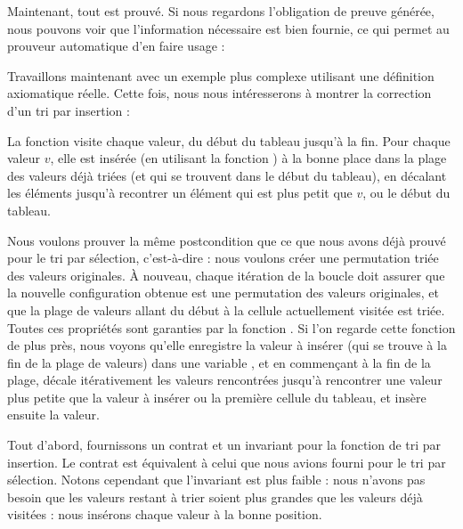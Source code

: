 


Maintenant, tout est prouvé. Si nous regardons l'obligation de preuve générée,
nous pouvons voir que l'information nécessaire est bien fournie, ce qui permet
au prouveur automatique d'en faire usage :






Travaillons maintenant avec un exemple plus complexe utilisant une définition
axiomatique réelle. Cette fois, nous nous intéresserons à montrer la correction
d'un tri par insertion :




La fonction  visite chaque valeur, du début du tableau
jusqu'à la fin. Pour chaque valeur $v$, elle est insérée (en utilisant la fonction
) à la bonne place dans la plage des valeurs déjà triées (et qui
se trouvent dans le début du tableau), en décalant les éléments jusqu'à
recontrer un élément qui est plus petit que $v$, ou le début du tableau.



Nous voulons prouver la même postcondition que ce que nous avons déjà prouvé pour
le tri par sélection, c'est-à-dire : nous voulons créer une permutation triée des
valeurs originales. À nouveau, chaque itération de la boucle doit assurer que la
nouvelle configuration obtenue est une permutation des valeurs originales, et que
la plage de valeurs allant du début à la cellule actuellement visitée est triée.
Toutes ces propriétés sont garanties par la fonction . Si l'on
regarde cette fonction de plus près, nous voyons qu'elle enregistre la
valeur à insérer (qui se trouve à la fin de la plage de valeurs) dans une variable
, et en commençant à la fin de la plage, décale itérativement
les valeurs rencontrées jusqu'à rencontrer une valeur plus petite que la valeur à
insérer ou la première cellule du tableau, et insère ensuite la valeur.




Tout d'abord, fournissons un contrat et un invariant pour la fonction de tri
par insertion. Le contrat est équivalent à celui que nous avions fourni pour le
tri par sélection. Notons cependant que l'invariant est plus faible : nous
n'avons pas besoin que les valeurs restant à trier soient plus grandes que les
valeurs déjà visitées : nous insérons chaque valeur à la bonne position.



